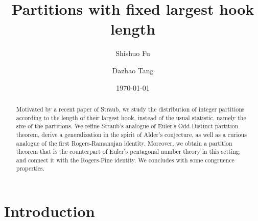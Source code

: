 \documentclass[12pt]{amsart}
\numberwithin{equation}{section}
\theoremstyle{plain}
\theoremstyle{definition}
\begin{document}
\title[Fixed largest hook length]{Partitions with fixed largest hook length}

\author[S. Fu]{Shishuo Fu}
\address[Shishuo Fu]{College of Mathematics and Statistics, Chongqing University, Huxi campus LD301, Chongqing 401331, P.R. China}


\author[D. Tang]{Dazhao Tang}

\address[Dazhao Tang]{College of Mathematics and Statistics, Chongqing University, Huxi campus LD208, Chongqing 401331, P.R. China}

\date{\today}


\begin{abstract}
Motivated by a recent paper of Straub, we study the distribution of integer partitions according to the length of their largest hook, instead of the usual statistic, namely the size of the partitions. We refine Straub's analogue of Euler's Odd-Distinct partition theorem, derive a generalization in the spirit of Alder's conjecture, as well as a curious analogue of the first Rogers-Ramanujan identity. Moreover, we obtain a partition theorem that is the counterpart of Euler's pentagonal number theory in this setting, and connect it with the Rogers-Fine identity. We concludes with some congruence properties.
\end{abstract}


\maketitle




\section{Introduction}\label{sec1}
\end{document}

